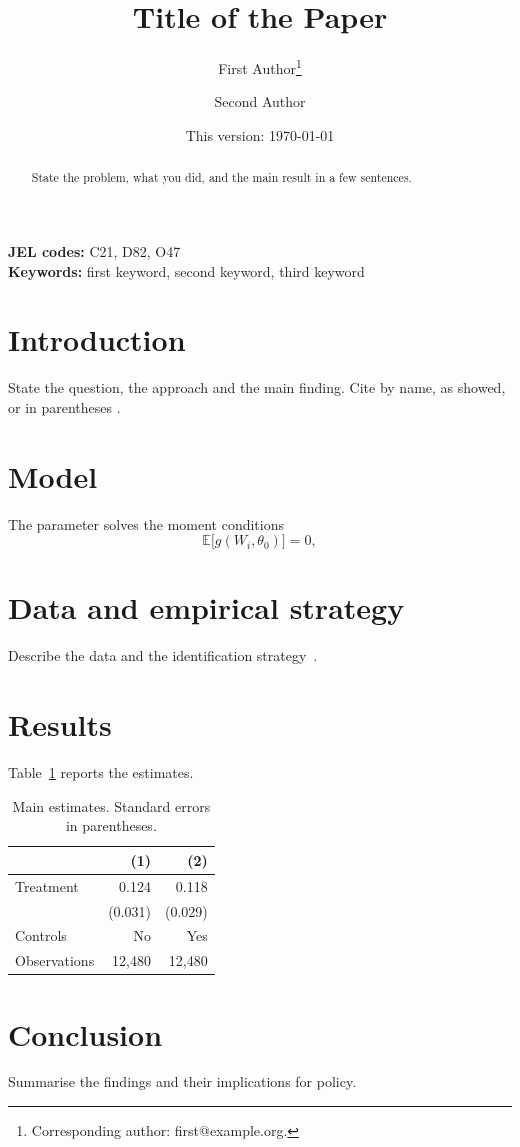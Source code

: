 \documentclass[12pt,a4paper]{article}
\title{Title of the Paper}
\author[1]{First Author\thanks{Corresponding author: first@example.org.}}
\author[2]{Second Author}
\affil[1]{Department of Economics, University, City, Country}
\affil[2]{Institute, City, Country}
\date{This version: \today}
\begin{document}
\maketitle

\begin{abstract}
State the problem, what you did, and the main result in a few sentences.
\end{abstract}

\noindent\textbf{JEL codes:} C21, D82, O47\\
\noindent\textbf{Keywords:} first keyword, second keyword, third keyword

\section{Introduction}
State the question, the approach and the main finding. Cite by name, as
\citet{akerlof1970} showed, or in parentheses \citep{solow1956}.

\section{Model}
The parameter solves the moment conditions
\begin{equation}
  \mathbb{E}\bigl[g(W_i, \theta_0)\bigr] = 0,
  \label{eq:main}
\end{equation}

\section{Data and empirical strategy}
Describe the data and the identification strategy~\citep{hansen1982,angrist2009}.

\section{Results}
Table~\ref{tab:results} reports the estimates.

\begin{table}[htbp]
  \centering
  \caption{Main estimates. Standard errors in parentheses.}
  \label{tab:results}
  \begin{tabular}{lrr}
    \toprule
     & (1) & (2) \\
    \midrule
    Treatment & 0.124 & 0.118 \\
     & (0.031) & (0.029) \\
    Controls & No & Yes \\
    Observations & 12{,}480 & 12{,}480 \\
    \bottomrule
  \end{tabular}
\end{table}

\section{Conclusion}
Summarise the findings and their implications for policy.



\end{document}
